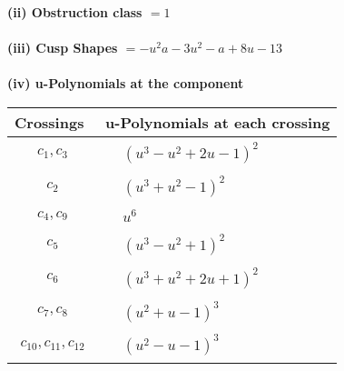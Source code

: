 \documentclass[1p]{elsarticle_modified}
\theoremstyle{definition}
\begin{document}
\flushleft \textbf{(ii) Obstruction class $= 1$}\\~\\
\flushleft \textbf{(iii) Cusp Shapes $= - u^2 a-3 u^2- a+8 u-13$}\\~\\
\newpage\renewcommand{\arraystretch}{1}
\flushleft \textbf{(iv) u-Polynomials at the component}\newline \\
\begin{tabular}{m{50pt}|m{274pt}}
Crossings & \hspace{64pt}u-Polynomials at each crossing \\
\hline $$\begin{aligned}c_{1},c_{3}\end{aligned}$$&$\begin{aligned}
&(u^3- u^2+2 u-1)^2
\end{aligned}$\\
\hline $$\begin{aligned}c_{2}\end{aligned}$$&$\begin{aligned}
&(u^3+u^2-1)^2
\end{aligned}$\\
\hline $$\begin{aligned}c_{4},c_{9}\end{aligned}$$&$\begin{aligned}
&u^6
\end{aligned}$\\
\hline $$\begin{aligned}c_{5}\end{aligned}$$&$\begin{aligned}
&(u^3- u^2+1)^2
\end{aligned}$\\
\hline $$\begin{aligned}c_{6}\end{aligned}$$&$\begin{aligned}
&(u^3+u^2+2 u+1)^2
\end{aligned}$\\
\hline $$\begin{aligned}c_{7},c_{8}\end{aligned}$$&$\begin{aligned}
&(u^2+u-1)^3
\end{aligned}$\\
\hline $$\begin{aligned}c_{10},c_{11},c_{12}\end{aligned}$$&$\begin{aligned}
&(u^2- u-1)^3
\end{aligned}$\\
\hline
\end{tabular}\\~\\
\end{document}
